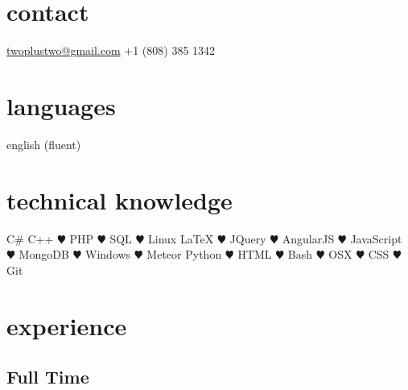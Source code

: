 \documentclass[]{friggeri-cv} %
\begin{document}


\begin{aside} %
\section{contact}
\href{mailto:twoplustwo@gmail.com}{twoplustwo@gmail.com}
+1 (808) 385 1342
\section{languages}
english (fluent)
\section{technical knowledge}
C\#
C++
{\color{red} $\varheartsuit$} PHP
{\color{red} $\varheartsuit$} SQL
{\color{red} $\varheartsuit$} Linux
LaTeX
{\color{red} $\varheartsuit$} JQuery
{\color{red} $\varheartsuit$} AngularJS
{\color{red} $\varheartsuit$} JavaScript
{\color{red} $\varheartsuit$} MongoDB
{\color{red} $\varheartsuit$} Windows
{\color{red} $\varheartsuit$} Meteor
Python
{\color{red} $\varheartsuit$} HTML
{\color{red} $\varheartsuit$} Bash
{\color{red} $\varheartsuit$} OSX
{\color{red} $\varheartsuit$} CSS
{\color{red} $\varheartsuit$} Git
\end{aside}



\section{experience}

\subsection{Full Time}
\end{document}
